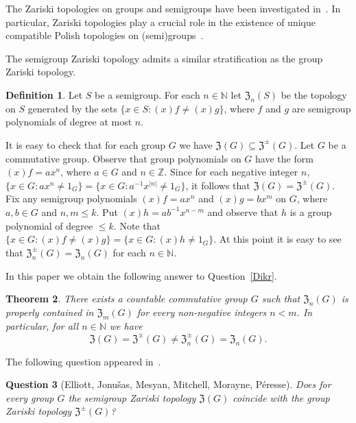 \documentclass[11pt]{amsart}
\newtheorem{theorem}{Theorem}[section]
\newtheorem{question}[theorem]{Question}
\theoremstyle{definition}
\newtheorem{definition}[theorem]{Definition}
\newcommand{\N}{\mathbb N}
\begin{document}
The Zariski topologies on groups and semigroups have been investigated in~\cite{Banakh, BT, BMR,Bogo,B,DikranjanToller, DT1, DS1, DS2, DS3, DS4, Jacobs, PS, PS2}. In particular, Zariski topologies play a crucial role in the existence of unique compatible Polish topologies on (semi)groups~\cite{main,main1,Gaughan,Gh,K2,KM,KR,R,Sa}.

The semigroup Zariski topology admits a similar stratification as the group Zariski topology. 

\begin{definition}
Let $S$ be a semigroup. For each $n\in\N$ let $\mathfrak{Z}_n(S)$ be the topology on $S$ 
 generated by the sets $\{x\in S: (x)f\neq (x)g\}$, where $f$ and $g$ are semigroup polynomials of degree at most $n$.     
\end{definition}

It is easy to check that for each group $G$ we have $\mathfrak{Z}(G)\subseteq \mathfrak{Z}^{\pm}(G)$. Let $G$ be a commutative group. Observe that group polynomials on $G$ have the form $(x)f=ax^n$, where $a\in G$ and $n\in \mathbb Z$. Since for each negative integer $n$, $\{x\in G: ax^n\neq 1_G\}=\{x\in G: a^{-1}x^{|n|}\neq 1_G\}$, it follows that $\mathfrak{Z}(G)=\mathfrak{Z}^{\pm}(G)$. Fix any semigroup polynomials $(x)f=ax^n$ and $(x)g=bx^m$ on $G$, where $a,b\in G$ and $n,m\leq k$. Put $(x)h=ab^{-1}x^{n-m}$ and observe that $h$ is a group polynomial of degree $\leq k$. Note that 
$\{x\in G: (x)f\neq (x)g\}=\{x\in G: (x)h\neq 1_G\}$. 
At this point it is easy to see that $\mathfrak{Z}^{\pm}_n(G)=\mathfrak{Z}_n(G)$ for each $n\in\N$.

In this paper we obtain the following answer to Question~\ref{Dikr}. 

\begin{theorem}\label{thcom}
There exists a countable commutative group $G$ such that $\mathfrak{Z}_{n}(G)$ is properly contained in $\mathfrak{Z}_{m}(G)$ for every non-negative integers $n<m$. In particular,
 for all \(n\in \N\) we have 
\[\mathfrak{Z}(G)=\mathfrak{Z}^{\pm}(G)\neq \mathfrak{Z}^{\pm}_{n}(G)=\mathfrak{Z}_{n}(G).\]   
\end{theorem}



The following question appeared in~\cite[Question 2.8]{main}.

\begin{question}[Elliott, Jonu\v{s}as, Mesyan, Mitchell, Morayne, P\'{e}resse]\label{q3}
Does for every group $G$ the semigroup Zariski topology $\mathfrak{Z}(G)$ coincide with the group Zariski topology $\mathfrak{Z}^{\pm}(G)$?
\end{question}
\end{document}
